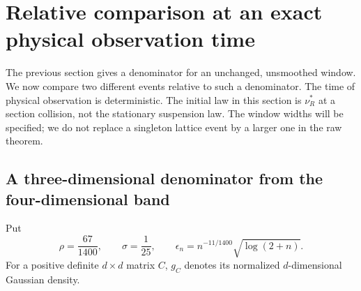 \section{Relative comparison at an exact physical observation time}
\label{sec:relative-physical-windows}
The previous section gives a denominator for an unchanged, unsmoothed
window. We now compare two different events relative to such a
denominator. The time of physical observation is deterministic. The
initial law in this section is $\nu_R^*$ at a section collision, not
the stationary suspension law. The window widths will be specified;
we do not replace a singleton lattice event by a larger one in the
raw theorem.

\subsection{A three-dimensional denominator from the four-dimensional band}
Put
\begin{equation}\label{eq:physical-window-exponents}
 \rho=\frac{67}{1400},\qquad \sigma=\frac1{25},\qquad
 \epsilon_n=n^{-11/1400}\sqrt{\log(2+n)}.
\end{equation}
For a positive definite $d\times d$ matrix $C$, $g_C$ denotes its
normalized $d$-dimensional Gaussian density.

